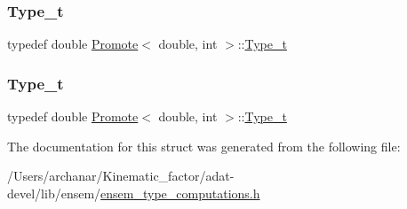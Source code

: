 \subsubsection{\texorpdfstring{Type\_t}{Type\_t}\hspace{0.1cm}{\footnotesize\ttfamily [2/3]}}
{\footnotesize\ttfamily typedef double \mbox{\hyperlink{structPromote}{Promote}}$<$ double, int $>$\+::\mbox{\hyperlink{structPromote_3_01double_00_01int_01_4_a55905f49138ff7e74738c0975fbfe652}{Type\+\_\+t}}}

\mbox{\label{structPromote_3_01double_00_01int_01_4_a55905f49138ff7e74738c0975fbfe652}} 
\subsubsection{\texorpdfstring{Type\_t}{Type\_t}\hspace{0.1cm}{\footnotesize\ttfamily [3/3]}}
{\footnotesize\ttfamily typedef double \mbox{\hyperlink{structPromote}{Promote}}$<$ double, int $>$\+::\mbox{\hyperlink{structPromote_3_01double_00_01int_01_4_a55905f49138ff7e74738c0975fbfe652}{Type\+\_\+t}}}



The documentation for this struct was generated from the following file\+:\begin{DoxyCompactItemize}
\item 
/\+Users/archanar/\+Kinematic\+\_\+factor/adat-\/devel/lib/ensem/\mbox{\hyperlink{adat-devel_2lib_2ensem_2ensem__type__computations_8h}{ensem\+\_\+type\+\_\+computations.\+h}}\end{DoxyCompactItemize}
